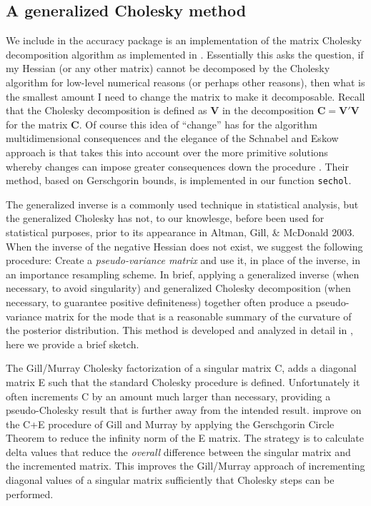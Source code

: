 \documentclass[11pt]{article}
\let\code=\texttt
\newcommand{\pkg}[1]{{\normalfont\fontseries{b}\selectfont #1}}
\begin{document}
\subsection{A generalized Cholesky method}

We include in the \pkg{accuracy} package is an implementation of the \citet{SchEsk90} matrix
Cholesky decomposition algorithm as implemented in \citet{GilKin04}. Essentially this asks the question, 
if my Hessian (or any other matrix) cannot be decomposed by the Cholesky algorithm for low-level numerical 
reasons (or perhaps other reasons), then what is the smallest amount I need to change the matrix to make 
it decomposable. Recall that the Cholesky decomposition is defined as $\mathbf{V}$ in the decomposition 
$\mathbf{C} = \mathbf{V}'\mathbf{V}$ for the matrix $\mathbf{C}$. Of course this idea of ``change'' has 
for the algorithm multidimensional consequences and the elegance of the Schnabel and Eskow approach is that 
takes this into account over the more primitive solutions whereby changes can impose greater consequences
down the procedure \citep{GilMur74}. Their method, based on Gerschgorin bounds, is implemented in our
function \code{sechol}.

The generalized inverse is a commonly used technique
in statistical analysis, but the generalized Cholesky has not, to our knowlesge, before
been used for statistical purposes, prior to its appearance in Altman, Gill, \& McDonald 2003. When the inverse of the negative Hessian does not exist, we suggest
the following procedure: Create a
\emph{pseudo-variance matrix} and use it, in place of the inverse, in
an importance resampling scheme.
In brief, applying a generalized inverse (when necessary, to avoid singularity) and generalized
Cholesky decomposition (when necessary, to guarantee positive
definiteness) together often produce a pseudo-variance matrix for the
mode that is a reasonable summary of the curvature of the posterior
distribution. This method is developed and analyzed in detail in \citet{GilKin04},
here we provide a brief sketch.

The Gill/Murray Cholesky factorization of a singular matrix C, adds 
a diagonal matrix E such that the standard Cholesky procedure is defined. 
Unfortunately it often increments C by an amount much larger than necessary, providing 
a pseudo-Cholesky result that is further away from the intended result. 
\citet{SchEsk90} improve on the C+E procedure of Gill and Murray by
applying the Gerschgorin Circle Theorem to reduce the infinity norm of the E matrix. The strategy is to calculate
delta values that reduce the \emph{overall} difference between the singular matrix and
the incremented matrix. This improves the Gill/Murray approach of incrementing diagonal
values of a singular matrix sufficiently that Cholesky steps can be performed.
\end{document}
